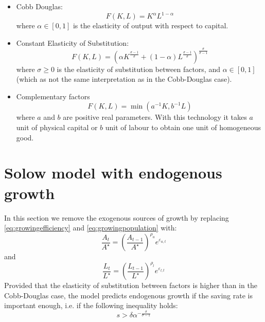 \documentclass[twoside]{amsart}
\begin{document}
\begin{itemize}
\item Cobb Douglas:
  \[
    F(K, L) = K^{\alpha}L^{1-\alpha}
  \]
  where $\alpha\in[0,1]$ is the elasticity of output with respect to capital.\newline
\item Constant Elasticity of Substitution:
  \[
    F(K, L) = \left(\alpha K^{\frac{\sigma-1}{\sigma}} + (1-\alpha) L^{\frac{\sigma-1}{\sigma}}\right)^{\frac{\sigma}{\sigma-1}}
  \]
  where $\sigma \geq 0$ is the elasticity of substitution between factors, and $\alpha\in[0,1]$ (which as not the same interpretation as in the Cobb-Douglas case).\newline
\item Complementary factors
  \[
    F(K, L) = \min (a^{-1}K, b^{-1}L)
  \]
  where $a$ and $b$ are positive real parameters. With this technology
  it takes $a$ unit of physical capital or $b$ unit of labour to
  obtain one unit of homogeneous good.\newline
\end{itemize}

\section{Solow model with endogenous growth}
\label{sec:2}

In this section we remove the exogenous sources of growth by replacing \ref{eq:growingefficiency} and \ref{eq:growingpopulation} with:
\begin{equation}
  \label{eq:stationarypopulation}
    \frac{A_t}{A^{\star}} = \left(\frac{A_{t-1}}{A^{\star}}\right)^{\rho_a}e^{\varepsilon_{a,t}}
\end{equation}
and
\begin{equation}
  \label{eq:stationarypopulation}
    \frac{L_t}{L^{\star}} = \left(\frac{L_{t-1}}{L^{\star}}\right)^{\rho_l}e^{\varepsilon_{l,t}}
\end{equation}
Provided that the elasticity of substitution between factors is higher
than in the Cobb-Douglas case, the model predicts endogenous growth if
the saving rate is important enough, i.e. if the following inequality
holds:
\[
s > \delta\alpha^{-\frac{\sigma}{\sigma-1}}
\]
\end{document}
